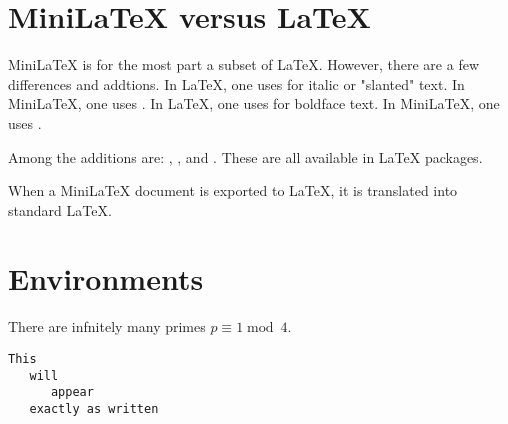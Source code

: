 \section{MiniLaTeX versus LaTeX}

MiniLaTeX is for the most part a subset of LaTeX.  However, there are a few differences and addtions.  In LaTeX, one uses  for italic or "slanted" text.  In MiniLaTeX, one uses .   In LaTeX, one uses  for boldface text.  In MiniLaTeX, one uses .

Among the additions are: , ,  and .  These are all available in LaTeX packages.

When a MiniLaTeX document is exported to LaTeX, it is translated into  standard LaTeX.

\section{Environments}

\begin{theorem}
\label{thm-primes}
There are infnitely many primes $p \equiv 1 \mathop{mod}\ 4$.
\end{theorem}

\begin{verbatim}
This
   will
      appear
   exactly as written
\end{verbatim}
